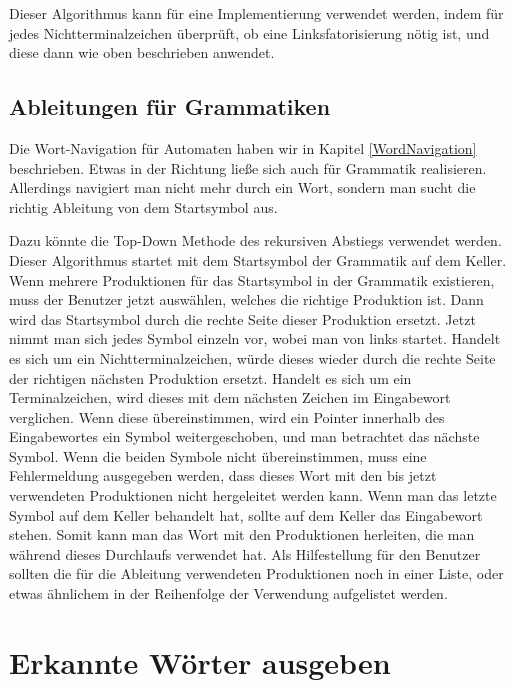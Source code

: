 Dieser Algorithmus kann für eine Implementierung verwendet werden, indem für
jedes Nichtterminalzeichen überprüft, ob eine Linksfatorisierung nötig ist, und
diese dann wie oben beschrieben anwendet.


\subsection{Ableitungen für Grammatiken}\label{PerspectiveGrammarWordNavigation}

Die Wort-Navigation für Automaten haben wir in Kapitel
\ref{WordNavigation} beschrieben. Etwas in der Richtung ließe sich
auch für Grammatik realisieren. Allerdings navigiert man nicht mehr
durch ein Wort, sondern man sucht die richtig Ableitung von dem
Startsymbol aus.\vspace{10pt}

Dazu könnte die Top-Down Methode des rekursiven Abstiegs verwendet werden. Dieser
Algorithmus startet mit dem Startsymbol der Grammatik auf dem Keller. Wenn
mehrere Produktionen für das Startsymbol in der Grammatik existieren, muss der
Benutzer jetzt auswählen, welches die richtige Produktion ist. Dann wird das
Startsymbol durch die rechte Seite dieser Produktion ersetzt. Jetzt nimmt man
sich jedes Symbol einzeln vor, wobei man von links startet. Handelt es sich um
ein Nichtterminalzeichen, würde dieses wieder durch die rechte Seite der
richtigen nächsten Produktion ersetzt. Handelt es sich um ein Terminalzeichen,
wird dieses mit dem nächsten Zeichen im Eingabewort verglichen. Wenn diese
übereinstimmen, wird ein Pointer innerhalb des Eingabewortes ein Symbol
weitergeschoben, und man betrachtet das nächste Symbol. Wenn die beiden Symbole
nicht übereinstimmen, muss eine Fehlermeldung ausgegeben werden, dass dieses Wort
mit den bis jetzt verwendeten Produktionen nicht hergeleitet werden kann. Wenn
man das letzte Symbol auf dem Keller behandelt hat, sollte auf dem Keller das
Eingabewort stehen. Somit kann man das Wort mit den Produktionen herleiten, die
man während dieses Durchlaufs verwendet hat. Als Hilfestellung für den Benutzer
sollten die für die Ableitung verwendeten Produktionen noch in einer Liste, oder
etwas ähnlichem in der Reihenfolge der Verwendung aufgelistet
werden.\vspace{10pt}

\section{Erkannte Wörter ausgeben}\label{PerspectiveDetectedWords}

